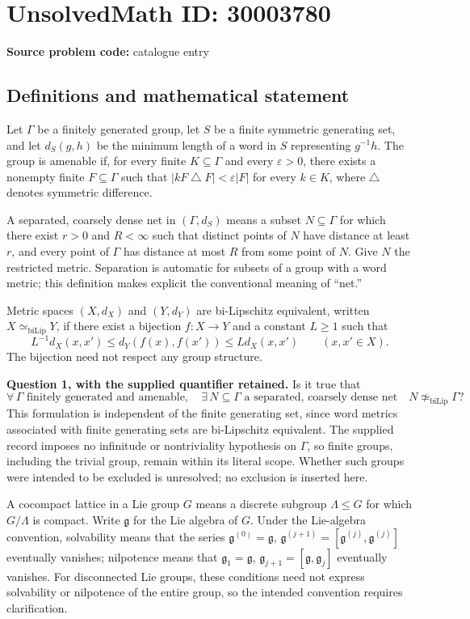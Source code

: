 \documentclass[11pt]{article}
\begin{document}
\section*{UnsolvedMath ID: 30003780}
\textbf{Source problem code:} catalogue entry
\subsection{Definitions and mathematical statement}
Let \(\Gamma\) be a finitely generated group, let \(S\) be a finite symmetric generating set, and let \(d_S(g,h)\) be the minimum length of a word in \(S\) representing \(g^{-1}h\). The group is amenable if, for every finite \(K\subseteq\Gamma\) and every \(\varepsilon>0\), there exists a nonempty finite \(F\subseteq\Gamma\) such that \(|kF\mathbin{\triangle}F|<\varepsilon|F|\) for every \(k\in K\), where \(\triangle\) denotes symmetric difference.

A separated, coarsely dense net in \((\Gamma,d_S)\) means a subset \(N\subseteq\Gamma\) for which there exist \(r>0\) and \(R<\infty\) such that distinct points of \(N\) have distance at least \(r\), and every point of \(\Gamma\) has distance at most \(R\) from some point of \(N\). Give \(N\) the restricted metric. Separation is automatic for subsets of a group with a word metric; this definition makes explicit the conventional meaning of ``net.''

Metric spaces \((X,d_X)\) and \((Y,d_Y)\) are bi-Lipschitz equivalent, written \(X\simeq_{\mathrm{biLip}}Y\), if there exist a bijection \(f:X\to Y\) and a constant \(L\geq1\) such that
\[
L^{-1}d_X(x,x')\leq d_Y(f(x),f(x'))\leq Ld_X(x,x')\qquad(x,x'\in X).
\]
The bijection need not respect any group structure.

\textbf{Question 1, with the supplied quantifier retained.} Is it true that
\[
\forall\,\Gamma\text{ finitely generated and amenable},\quad
\exists\,N\subseteq\Gamma\text{ a separated, coarsely dense net}
\quad N\not\simeq_{\mathrm{biLip}}\Gamma?
\]
This formulation is independent of the finite generating set, since word metrics associated with finite generating sets are bi-Lipschitz equivalent. The supplied record imposes no infinitude or nontriviality hypothesis on \(\Gamma\), so finite groups, including the trivial group, remain within its literal scope. Whether such groups were intended to be excluded is unresolved; no exclusion is inserted here.

A cocompact lattice in a Lie group \(G\) means a discrete subgroup \(\Lambda\leq G\) for which \(G/\Lambda\) is compact. Write \(\mathfrak g\) for the Lie algebra of \(G\). Under the Lie-algebra convention, solvability means that the series \(\mathfrak g^{(0)}=\mathfrak g\), \(\mathfrak g^{(j+1)}=[\mathfrak g^{(j)},\mathfrak g^{(j)}]\) eventually vanishes; nilpotence means that \(\mathfrak g_1=\mathfrak g\), \(\mathfrak g_{j+1}=[\mathfrak g,\mathfrak g_j]\) eventually vanishes. For disconnected Lie groups, these conditions need not express solvability or nilpotence of the entire group, so the intended convention requires clarification.
\end{document}
